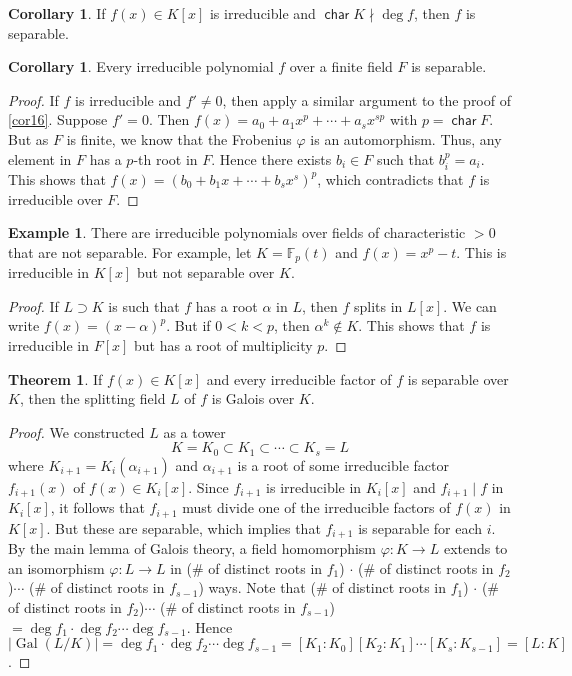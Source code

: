 \documentclass[10pt,letterpaper,cm]{nupset}
\theoremstyle{definition}
\newtheorem{exmp}[definition]{Example}
\theoremstyle{theorem}
\newtheorem{theorem}[definition]{Theorem}
\newtheorem{corollary}[definition]{Corollary}
\theoremstyle{remark}
\newcommand{\F}{\mathbb F}
\newcommand{\1}{\mathbf{1}}
\newcommand{\0}{\vec 0}
\DeclareMathOperator{\Char}{\mathsf{char}}
\DeclareMathOperator{\gal}{Gal}
\begin{document}
\begin{corollary}
If $f(x) \in K[x]$ is irreducible and $\Char{K} \nmid \deg{f}$, then $f$ is separable. 
\end{corollary}

\begin{corollary}
Every irreducible polynomial $f$ over a finite field $F$ is separable. 
\end{corollary}
\begin{proof}
If $f$ is irreducible and $f' \ne 0$, then apply a similar argument to the proof of \cref{cor16}. Suppose $f'=0$. Then $f(x) = a_0 + a_1x^p + \cdots + a_sx^{sp}$ with $p= \Char{F}$. But as $F$ is finite, we know that the Frobenius $\varphi$ is an automorphism. Thus, any element in $F$ has a $p$-th root in $F$. Hence there exists $b_i \in F$ such that $b_i^p = a_i$. This shows that $f(x) = (b_0 + b_1x + \cdots + b_sx^s)^p$, which contradicts that $f$ is irreducible over $F$.
\end{proof}

\begin{exmp}
There are irreducible polynomials over fields of characteristic $>0$ that are not separable. For example, let $K = \F_p(t)$ and $f(x) = x^p-t$. This is irreducible in $K[x]$ but not separable over $K$.
\end{exmp}
\begin{proof}
 If $L \supset K$ is such that $f$ has a root $\alpha$ in $L$, then $f$ splits in $L[x]$. We can write $f(x) = (x-\alpha)^p$. But if $0 <k < p$, then $\alpha^k \notin K$. This shows that $f$ is irreducible in $F[x]$ but has a root of multiplicity $p$.
\end{proof}

\begin{theorem}
If $f(x) \in K[x]$ and every irreducible factor of $f$ is separable over $K$, then the splitting field $L$ of $f$ is Galois over $K$.
\end{theorem}
\begin{proof}
We constructed $L$ as a tower $$K = K_0 \subset K_1 \subset \cdots \subset K_s = L$$ where $K_{i+1} = K_i(\alpha_{i+1})$ and $\alpha_{i+1}$  is a root of some irreducible factor $f_{i+1}(x)$ of $f(x)\in K_i[x]$. Since $f_{i+1}$ is irreducible in $K_i[x]$ and $f_{i+1} \mid f $ in $K_i[x]$, it follows that $f_{i+1}$ must divide one of the irreducible factors of $f(x)$ in $K[x]$. But these are separable, which implies that $f_{i+1}$ is separable for each $i$. By the main lemma of Galois theory, a field homomorphism $\varphi : K \to L$ extends to an isomorphism $\varphi : L \to L$ in (\# of distinct roots in $f_1$) $\cdot$ (\# of distinct roots in $f_2$)$\cdots$ (\# of distinct roots in $f_{s-1}$) ways. Note that (\# of distinct roots in $f_1$) $\cdot$ (\# of distinct roots in $f_2$)$\cdots$ (\# of distinct roots in $f_{s-1}$) $= \deg{f_1}\cdot \deg{f_2} \cdots \deg{f_{s-1}}$. Hence $\lvert{\gal(L/K)}\rvert = \deg{f_1}\cdot \deg{f_2} \cdots \deg{f_{s-1}} = [K_1: K_0][K_2: K_1] \cdots [K_s: K_{s-1}] = [L:K]$.
\end{proof}
\end{document}
